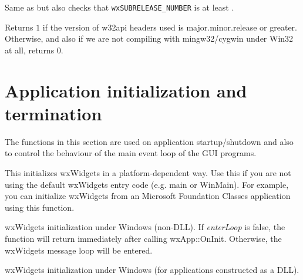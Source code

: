 \label{wxcheckversionfull}


Same as  but also checks that 
\texttt{wxSUBRELEASE\_NUMBER} is at least .


\label{wxcheckw32apiversion}


Returns $1$ if the version of w32api headers used is major.minor.release or
greater. Otherwise, and also if we are not compiling with mingw32/cygwin under
Win32 at all, returns $0$.



\section{Application initialization and termination}\label{appinifunctions}

The functions in this section are used on application startup/shutdown and also
to control the behaviour of the main event loop of the GUI programs.


\label{wxentry}

This initializes wxWidgets in a platform-dependent way. Use this if you
are not using the default wxWidgets entry code (e.g. main or WinMain). For example,
you can initialize wxWidgets from an Microsoft Foundation Classes application using
this function.


wxWidgets initialization under Windows (non-DLL). If {\it enterLoop} is false, the
function will return immediately after calling wxApp::OnInit. Otherwise, the wxWidgets
message loop will be entered.


wxWidgets initialization under Windows (for applications constructed as a DLL).


